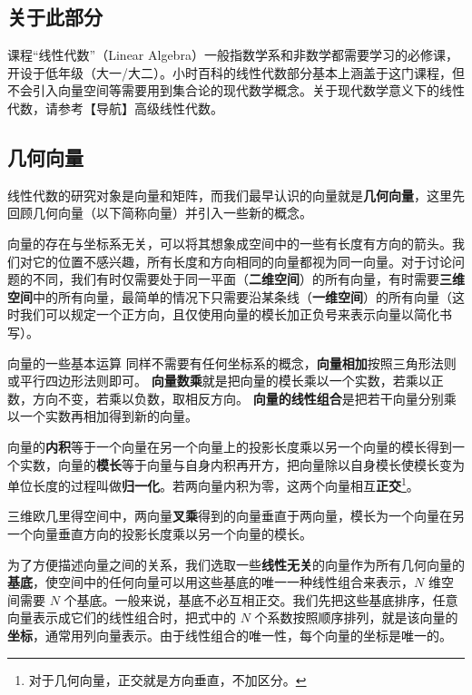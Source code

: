 
\begin{issues}
\issueDraft
\end{issues}


\subsection{关于此部分}

课程“线性代数”（Linear Algebra）一般指数学系和非数学都需要学习的必修课，开设于低年级（大一/大二）。小时百科的线性代数部分基本上涵盖于这门课程，但不会引入向量空间等需要用到集合论的现代数学概念。关于现代数学意义下的线性代数，请参考【导航】高级线性代数。

\subsection{几何向量}

线性代数的研究对象是向量和矩阵，而我们最早认识的向量就是\textbf{几何向量}，这里先回顾几何向量（以下简称向量）并引入一些新的概念。

向量的存在与坐标系无关，可以将其想象成空间中的一些有长度有方向的箭头。我们对它的位置不感兴趣，所有长度和方向相同的向量都视为同一向量。对于讨论问题的不同，我们有时仅需要处于同一平面（\textbf{二维空间}）的所有向量，有时需要\textbf{三维空间}中的所有向量，最简单的情况下只需要沿某条线（\textbf{一维空间}）的所有向量（这时我们可以规定一个正方向，且仅使用向量的模长加正负号来表示向量以简化书写）。

向量的一些基本运算 同样不需要有任何坐标系的概念，\textbf{向量相加}按照三角形法则或平行四边形法则即可。
\textbf{向量数乘}就是把向量的模长乘以一个实数，若乘以正数，方向不变，若乘以负数，取相反方向。 \textbf{向量的线性组合}是把若干向量分别乘以一个实数再相加得到新的向量。

向量的\textbf{内积}等于一个向量在另一个向量上的投影长度乘以另一个向量的模长得到一个实数，向量的\textbf{模长}等于向量与自身内积再开方，把向量除以自身模长使模长变为单位长度的过程叫做\textbf{归一化}。若两向量内积为零，这两个向量相互\textbf{正交}\footnote{对于几何向量，正交就是方向垂直，不加区分。}。

三维欧几里得空间中，两向量\textbf{叉乘}得到的向量垂直于两向量，模长为一个向量在另一个向量垂直方向的投影长度乘以另一个向量的模长。

为了方便描述向量之间的关系，我们选取一些\textbf{线性无关}的向量作为所有几何向量的\textbf{基底}，使空间中的任何向量可以用这些基底的唯一一种线性组合来表示，$N$ 维空间需要 $N$ 个基底。一般来说，基底不必互相正交。我们先把这些基底排序，任意向量表示成它们的线性组合时，把式中的 $N$ 个系数按照顺序排列，就是该向量的\textbf{坐标}，通常用列向量表示。由于线性组合的唯一性，每个向量的坐标是唯一的。

